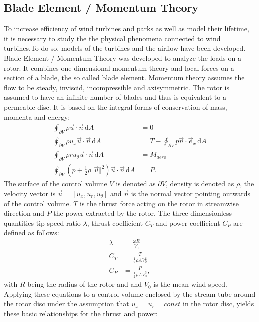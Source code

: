 \subsection{Blade Element / Momentum Theory}
To increase efficiency of wind turbines and parks as well as model their lifetime, it is necessary to study the  the physical phenomena connected to wind turbines.To do so, models of the turbines and the airflow have been developed. Blade Element / Momentum Theory was developed to analyze the loads on a rotor. It combines one-dimensional momentum theory and local forces on a section of a blade, the so called blade element. Momentum theory assumes the flow to be steady, inviscid, incompressible and axisymmetric. The rotor is assumed to have an infinite number of blades and thus is equivalent to a permeable disc. It is based on the integral forms of conservation of mass, momenta and energy:
\begin{align}
	\oint_{\partial V} \rho \vec{u} \cdot \vec{n} \, \mathrm{d}A &= 0 \label{eq:mass_cons}\\
	\oint_{\partial V} \rho u_x \vec{u} \cdot \vec{n} \, \mathrm{d}A &= T - \oint_{\partial V} p \vec{n}\cdot \vec{e}_x \, \mathrm{d}A   \label{eq:thrust} \\
	\oint_{\partial V} \rho r u_\theta \vec{u} \cdot \vec{n} \, \mathrm{d}A  &= M_{aero} \label{eq:torque}\\
	\oint_{\partial V} \left(p + \frac{1}{2} \rho \Vert\vec{u} \Vert^2\right) \vec{u} \cdot \vec{n} \, \mathrm{d}A  &= P. \label{eq:power}
\end{align}	The surface of the control volume $V$ is denoted as $\partial V$, density is denoted as $\rho$, the velocity vector is $\vec{u}= \left[u_x, u_r, u_\theta \right]$  and $\vec{n}$ is the normal vector pointing outwards of the control volume. $T$ is the thrust force acting on the rotor in streamwise direction and $P$ the power extracted by the rotor.
The three dimensionless quantities tip speed ratio $\lambda$, thrust coefficient $C_T$ and power coefficient $C_P$ are defined as follows:
\begin{align}
\lambda &= \frac{\omega R}{V_0} \\
C_T &= \frac{T}{\frac{1}{2} \rho A V_0^2} \\
C_P &= \frac{P}{\frac{1}{2} \rho A V_0^3},
\end{align}
with $R$ being the radius of the rotor and and $V_0$ is the mean wind speed.
Applying these equations to a control volume enclosed by the stream tube around the rotor disc under the assumption that $u_x = u_r = const$ in the rotor disc, yields these basic relationships for the thrust and power:
